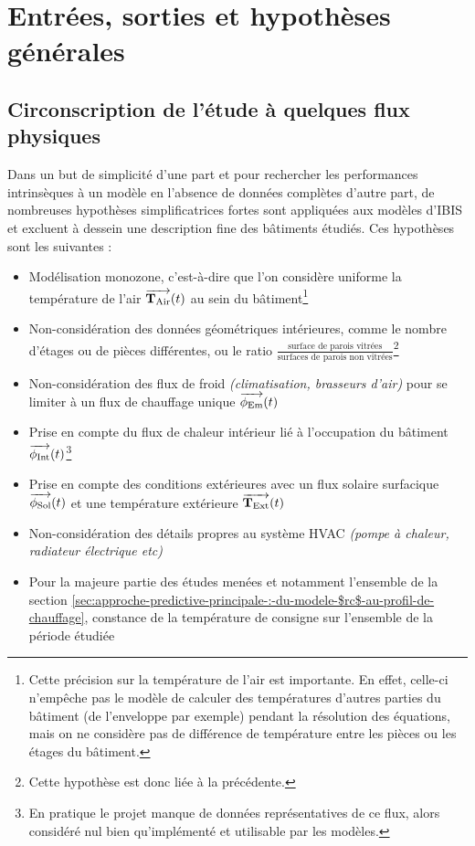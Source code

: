 \section{Entrées, sorties et hypothèses générales}\label{sec:entrees-sorties-et-fonctionnement-general}

    \subsection{Circonscription de l'étude à quelques flux physiques}\label{subsec:circonscription-de-l'etude-a-quelques-flux-physiques}

        Dans un but de simplicité d'une part et pour rechercher les performances intrinsèques à un modèle en l'absence de données complètes d'autre part, de nombreuses hypothèses simplificatrices fortes sont
        appliquées aux modèles d'IBIS et excluent à dessein une description fine des bâtiments étudiés.
        Ces hypothèses sont les suivantes :
        \begin{itemize}
            \item Modélisation monozone, c'est-à-dire que l'on considère uniforme la température de l'air $\operatorname{\overrightarrow{\mathbf{T}_{\text{Air}}}}(t)$ au sein du bâtiment\footnote{Cette précision sur la température de l'air est importante. En effet, celle-ci n'empêche pas le modèle de calculer des températures d'autres parties du bâtiment (de l'enveloppe par exemple) pendant la résolution des équations, mais on ne considère pas de différence de température entre les pièces ou les étages du bâtiment.}
            \item Non-considération des données géométriques intérieures, comme le nombre d'étages ou de pièces différentes, ou le ratio $\frac{\text{surface de parois vitrées}}{\text{surfaces de parois non vitrées}}$\footnote{Cette hypothèse est donc liée à la précédente.}
            \item Non-considération des flux de froid \textit{(climatisation, brasseurs d'air)} pour se limiter à un flux de chauffage unique $\operatorname{\overrightarrow{\mathbf{\phi}_{\text{Em}}}}(t)$
            \item Prise en compte du flux de chaleur intérieur lié à l'occupation du bâtiment $\operatorname{\overrightarrow{\phi_{\text{Int}}}}(t)$\footnote{En pratique le projet manque de données représentatives de ce flux, alors considéré nul bien qu'implémenté et utilisable par les modèles.}
            \item Prise en compte des conditions extérieures avec un flux solaire surfacique $\operatorname{\overrightarrow{\phi_{\text{Sol}}}}(t)$ et une température extérieure $\operatorname{\overrightarrow{\mathbf{T}_{\text{Ext}}}}(t)$
            \item Non-considération des détails propres au système \gls{HVAC} \textit{(pompe à chaleur, radiateur électrique etc)}
            \item Pour la majeure partie des études menées et notamment l'ensemble de la section \ref{sec:approche-predictive-principale-:-du-modele-$rc$-au-profil-de-chauffage}, constance de la température de consigne sur l'ensemble de la période étudiée
        \end{itemize}

